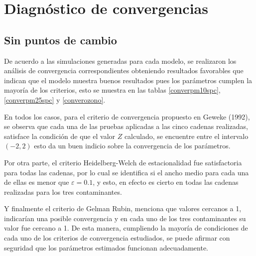 \chapter{Diagnóstico de convergencias}

\section{Sin puntos de cambio}
De acuerdo a las simulaciones generadas para cada modelo, se realizaron los análisis de convergencia correspondientes obteniendo resultados favorables que indican que el modelo muestra buenos resultados pues los parámetros cumplen la mayoría de los criterios, esto se muestra en las tablas \ref{converpm10spc}, \ref{converpm25spc} y 
\ref{converozono}. 

En todos los casos, para el criterio de convergencia propuesto en Geweke (1992), se observa que cada una de las pruebas aplicadas a las cinco cadenas realizadas, satisface la condición de que el valor $Z$ calculado, se encuentre entre el intervalo $(-2,2)$ esto da un buen indicio sobre la convergencia de los parámetros. 

Por otra parte, el criterio Heidelberg-Welch de estacionalidad fue  satisfactoria para todas las cadenas, por lo cual se identifica si el ancho medio para cada una de ellas es menor que $\varepsilon =0.1 $, y esto, en efecto es cierto en todas las cadenas realizadas para los tres contaminantes. 

Y finalmente el criterio de Gelman Rubin, menciona que valores cercanos a 1, indicarían una posible convergencia y en cada uno de los tres contaminantes su valor fue cercano a 1. De esta manera, cumpliendo la mayoría de condiciones de cada uno de los criterios de convergencia estudiados, se puede afirmar con seguridad que los parámetros estimados  funcionan adecuadamente. 



